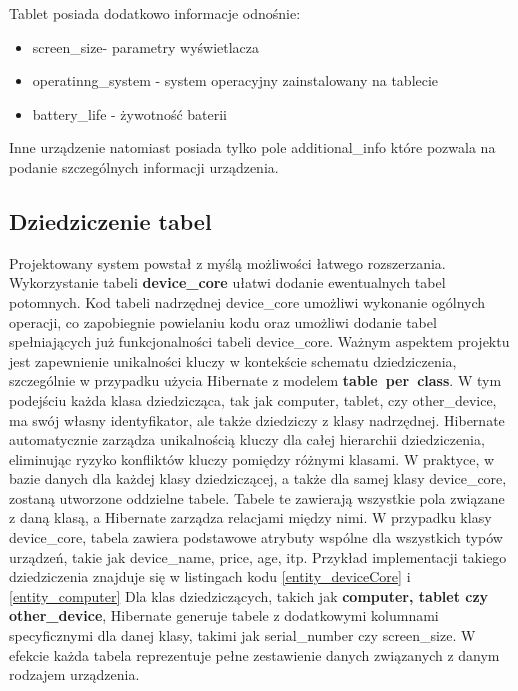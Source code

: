 Tablet posiada dodatkowo informacje odnośnie:
\begin{itemize}
	\item screen\_size- parametry wyświetlacza
	\item operatinng\_system - system operacyjny zainstalowany na tablecie
	\item battery\_life - żywotność baterii
\end{itemize}

Inne urządzenie natomiast posiada tylko pole additional\_info które pozwala na podanie szczególnych informacji urządzenia.

\subsection{Dziedziczenie tabel}
\label{dzedziczenie_hibernate:label}
Projektowany system powstał z myślą możliwości łatwego rozszerzania. Wykorzystanie tabeli \textbf{device\_core} ułatwi dodanie ewentualnych tabel potomnych. Kod tabeli nadrzędnej device\_core umożliwi wykonanie ogólnych operacji, co zapobiegnie powielaniu kodu oraz umożliwi dodanie tabel spełniających już funkcjonalności tabeli device\_core. Ważnym aspektem projektu jest zapewnienie unikalności kluczy w kontekście schematu dziedziczenia, szczególnie w przypadku użycia Hibernate z modelem \textbf{table~per~class}. W tym podejściu każda klasa dziedzicząca, tak jak computer, tablet, czy other\_device, ma swój własny identyfikator, ale także dziedziczy z klasy nadrzędnej. Hibernate automatycznie zarządza unikalnością kluczy dla całej hierarchii dziedziczenia, eliminując ryzyko konfliktów kluczy pomiędzy różnymi klasami. W praktyce, w bazie danych dla każdej klasy dziedziczącej, a także dla samej klasy device\_core, zostaną utworzone oddzielne tabele. Tabele te zawierają wszystkie pola związane z daną klasą, a Hibernate zarządza relacjami między nimi. W przypadku klasy device\_core, tabela zawiera podstawowe atrybuty wspólne dla wszystkich typów urządzeń, takie jak device\_name, price, age, itp. Przykład implementacji takiego dziedziczenia znajduje się w listingach kodu \ref{entity_deviceCore} i \ref{entity_computer}
\newline
Dla klas dziedziczących, takich jak \textbf{computer, tablet czy other\_device}, Hibernate generuje tabele z dodatkowymi kolumnami specyficznymi dla danej klasy, takimi jak serial\_number czy screen\_size. W efekcie każda tabela reprezentuje pełne zestawienie danych związanych z danym rodzajem urządzenia.


